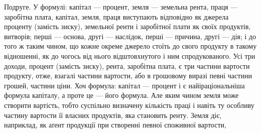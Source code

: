 Подруге. У формулі: капітал — процент, земля — земельна рента, праця —
заробітна плата, капітал, земля, праця виступають відповідно як джерела проценту
(замість зиску), земельної ренти і заробітної плати як своїх продуктів,
витворів; перші — основа, другі — наслідок, перші — причина, другі — дія; і до
того ж таким чином, що кожне окреме джерело стоїть до свого продукту в такому
відношенні, як до чогось від нього відштовхнутого і ним спродукованого.
Усі три доходи, процент (замість зиску), рента, заробітна плата, є три частини
вартости продукту, отже, взагалі частини вартости, або в грошовому виразі
певні частини грошей, частини ціни. Хоч формула: капітал — процент і є найіраціональніша формула
капіталу, а проте це — його формула. Але яким чином
земля може створити вартість, тобто суспільно визначену кількість праці і навіть
ту особливу частину вартости її власних продуктів, яка становить ренту. Земля
діє, наприклад, як аґент продукції при створенні певної споживної вартости,
\parbreak{}  %
